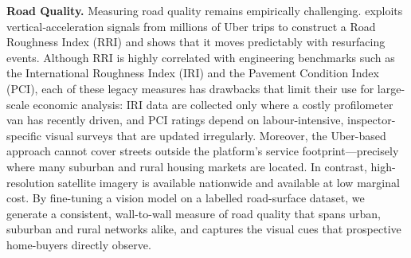 

{\bf Road Quality.} Measuring road quality remains empirically challenging. \cite{currier2023} exploits vertical‐acceleration signals from millions of Uber trips to construct a Road Roughness Index (RRI) and shows that it moves predictably with resurfacing events. Although RRI is highly correlated with engineering benchmarks such as the International Roughness Index (IRI) and the Pavement Condition Index (PCI), each of these legacy measures has drawbacks that limit their use for large-scale economic analysis: IRI data are collected only where a costly profilometer van has recently driven, and PCI ratings depend on labour-intensive, inspector-specific visual surveys that are updated irregularly. Moreover, the Uber-based approach cannot cover streets outside the platform’s service footprint—precisely where many suburban and rural housing markets are located. In contrast, high-resolution satellite imagery is available nationwide and available at low marginal cost. By fine-tuning a vision model on a labelled road-surface dataset, we generate a consistent, wall-to-wall measure of road quality that spans urban, suburban and rural networks alike, and captures the visual cues that prospective home-buyers directly observe. 

